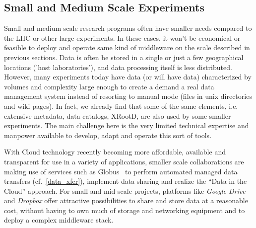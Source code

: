 \subsection{Small and Medium Scale Experiments}
Small and medium scale research programs often have smaller needs compared to the LHC or other large experiments. In these cases, it won't
be economical or feasible to deploy and operate same kind of middleware on the scale described in previous sections.
Data is often be stored in a single or just a few geographical locations ('host laboratories'), and
data processing itself is less distributed. However, many experiments today have data (or will have data) characterized by volumes
and complexity large enough to create a demand a real data management system instead of resorting to manual mode (files in unix directories and wiki pages). 
In fact, we already find that some of the same elements, i.e. extensive metadata, data catalogs, XRootD, are also used by some smaller 
experiments. The main challenge here is the very limited technical expertise and manpower available to develop, adapt and 
operate this sort of tools.

With Cloud technology recently becoming more affordable, available and transparent for use in a variety of applications, smaller
scale collaborations are making use of services such as Globus~\cite{globus} to perform automated managed data transfers (cf.~\ref{data_xfer}),
implement data sharing and realize the ``Data in the Cloud'' approach. For small and mid-scale projects, platforms like \textit{Google Drive}
and \textit{Dropbox} offer attractive possibilities to share and store data at a reasonable cost, without having to own much of storage and
networking equipment and to deploy a complex middleware stack.





